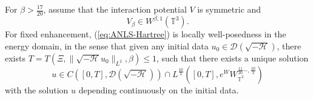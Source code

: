 \begin{prop}
  \label{prop:LWP-energy}For $\beta > \frac{17}{20}$, assume that the
  interaction potential $V$ is symmetric and
  \begin{equation}
    V_{\beta} \in W^{\beta, 1} (\mathbb{T}^3)  . \label{eq:reg-V-energy-space}
  \end{equation}
  For fixed enhancement, (\ref{eq:ANLS-Hartree}) is
  locally well-posedness in the energy domain, in the sense that given any
  initial data $u_0 \in \mathcal{D} \left( \sqrt{- \mathcal{H}} \right)$,
  there exists $T = T (\Xi, \| \sqrt{- \mathcal{H}} u_0 \|_{L^2}, \beta) \leqslant 1$, such that there exists a unique solution 
  \[
  u \in C \left([0, T], \mathcal{D}
  \left( \sqrt{- \mathcal{H}} \right)\right) \cap L^{\frac{10}{3}} \left( [0, T],
  e^W {W_{\mathbb{T}^3}^{\frac{11}{20} -, \frac{10}{3}}}  \right)
  \] with the
  solution $u$ depending continuously on the initial data. 
\end{prop}

